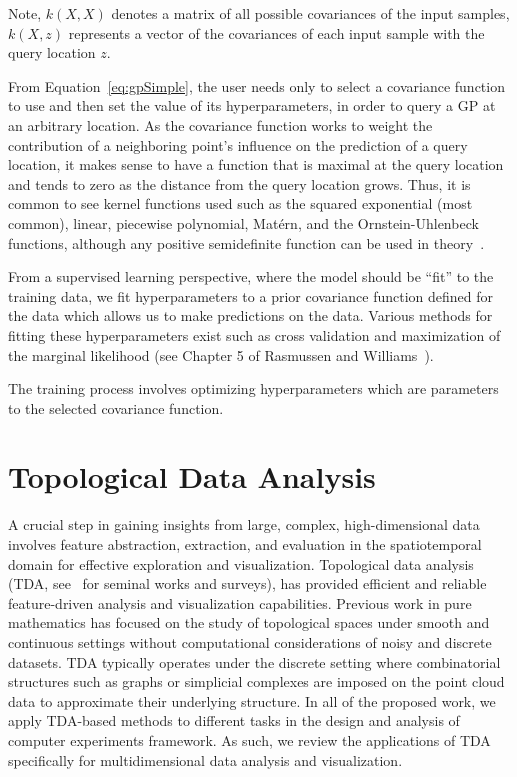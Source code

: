 Note, $k(X,X)$ denotes a matrix of all possible covariances of the input samples, $k(X,z)$ represents a vector of the covariances of each input sample with the query location $z$.

From Equation~\ref{eq:gpSimple}, the user needs only to select a covariance function to use and then set the value of its hyperparameters, in order to query a GP at an arbitrary location.
%
As the covariance function works to weight the contribution of a neighboring point's influence on the prediction of a query location, it makes sense to have a function that is maximal at the query location and tends to zero as the distance from the query location grows.
%
Thus, it is common to see kernel functions used such as the squared exponential (most common), linear, piecewise polynomial, Mat\'{e}rn, and the Ornstein-Uhlenbeck functions, although any positive semidefinite function can be used in theory~\cite{RasmussenWilliams2006}.

From a supervised learning perspective, where the model should be ``fit'' to the training data, we fit hyperparameters to a prior covariance function defined for the data which allows us to make predictions on the data.
%
Various methods for fitting these hyperparameters exist such as cross validation and maximization of the marginal likelihood (see Chapter 5 of Rasmussen and Williams~\cite{RasmussenWilliams2006}).

The training process involves optimizing hyperparameters which are parameters to the selected covariance function.


\section{Topological Data Analysis}
A crucial step in gaining insights from large, complex, high-dimensional data involves feature abstraction, extraction, and evaluation in the spatiotemporal domain for effective exploration and visualization.
%
Topological data analysis (TDA, see~\cite{EdsbrunnerHarer2010,Zomorodian2005,BiasottisDeFlorianiFalcidieno2008,Carlsson2009,EdelsbrunnerHarer2008,Ghrist2009} for seminal works and surveys), has provided efficient and reliable feature-driven analysis and visualization capabilities.
%
Previous work in pure mathematics has focused on the study of topological spaces under smooth and continuous settings without computational considerations of noisy and discrete datasets.
%
TDA typically operates under the discrete setting where combinatorial structures such as graphs or simplicial complexes are imposed on the point cloud data to approximate their underlying structure.
%
In all of the proposed work, we apply TDA-based methods to different tasks in the design and analysis of computer experiments framework.
%
As such, we review the applications of TDA specifically for multidimensional data analysis and visualization.


